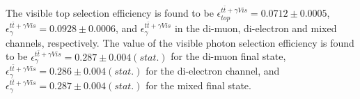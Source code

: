 The visible top selection efficiency is found to be $\epsilon^{t\bar{t}+\gamma Vis}_{top} = 0.0712 \pm 0.0005$, $\epsilon^{t\bar{t}+\gamma Vis}_{\gamma} = 0.0928 \pm 0.0006$, and $\epsilon^{t\bar{t}+\gamma Vis}_{\gamma}$ in the di-muon, di-electron and mixed channels, respectively. The value of the visible photon selection efficiency is found to be $\epsilon^{t\bar{t}+\gamma Vis}_{\gamma} = 0.287 \pm 0.004 ( stat.)$ for the di-muon final state, $\epsilon^{t\bar{t}+\gamma Vis}_{\gamma} = 0.286 ± 0.004 (stat.)$ for the di-electron channel, and $\epsilon^{t\bar{t}+\gamma Vis}_{\gamma} = 0.287 \pm 0.004 ( stat.)$ for the mixed final state.